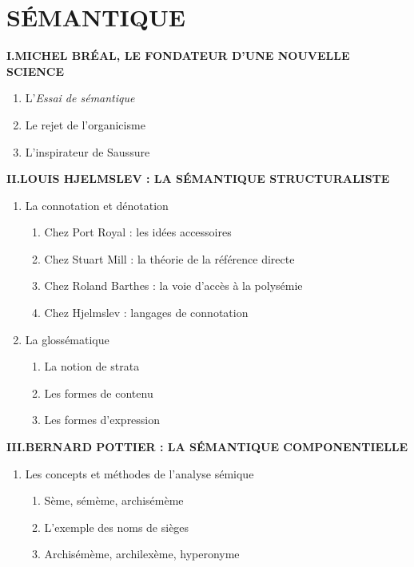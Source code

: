 \chapter{SÉMANTIQUE}
\label{chapter-11}
\begin{keybox}
\small{}
\renewcommand{\thempfootnote}{校\arabic{editorialnote}}
\textbf{I.\quad MICHEL BRÉAL, LE FONDATEUR D’UNE NOUVELLE SCIENCE}
\begin{enumerate}[label=\arabic*.]
\item L’\textit{Essai de sémantique}
\item Le rejet de l’organicisme
\item L’inspirateur de Saussure
\end{enumerate}
\textbf{II.\quad LOUIS HJELMSLEV : LA SÉMANTIQUE STRUCTURALISTE}
\begin{enumerate}[label=\arabic*.]
\item La connotation et dénotation
\begin{enumerate}[label=\textcircled{\scriptsize\arabic*}]
\item Chez Port Royal : les idées accessoires
\item Chez Stuart Mill : la théorie de la référence directe
\item Chez Roland Barthes : la voie d’accès à la polysémie
\item Chez Hjelmslev : langages de connotation
\end{enumerate}
\item La glossématique
\begin{enumerate}[label=\textcircled{\scriptsize\arabic*}]
\item La notion de strata
\item Les formes de contenu
\item Les formes d’expression
\end{enumerate}
\end{enumerate}
\textbf{III.\quad BERNARD POTTIER : LA SÉMANTIQUE COMPONENTIELLE}
\begin{enumerate}[label=\arabic*.]
\item Les concepts et méthodes de l’analyse sémique
\begin{enumerate}[label=\textcircled{\scriptsize\arabic*}]
\item Sème, sémème, archisémème
\item L’exemple des noms de sièges
\item Archisémème, archilexème, hyperonyme

\end{enumerate}
\end{enumerate}
\end{keybox}
